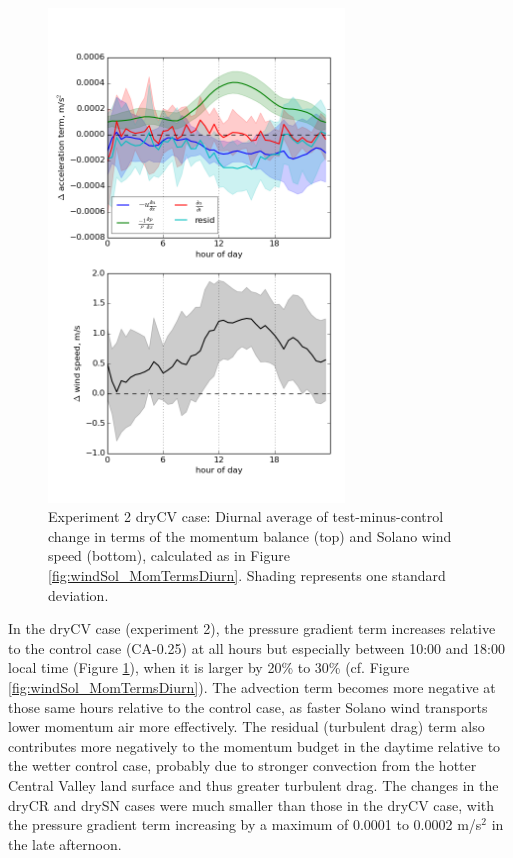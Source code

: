 \begin{figure}[here]
\includegraphics[width=0.7\textwidth]{ch3-wind/img/momentum_terms_diurnal_diff_dryCV.png}
\caption{Experiment 2 dryCV case: Diurnal average of test-minus-control change in terms of the momentum balance (top) and Solano wind speed (bottom), calculated as in Figure \ref{fig:windSol_MomTermsDiurn}.  Shading represents one standard deviation.}
\label{fig:windSol_MomTermsDiurnDiff}
\end{figure}

In the dryCV case (experiment 2), the pressure gradient term increases relative to the control case (CA-0.25) at all hours but especially between 10:00 and 18:00 local time (Figure \ref{fig:windSol_MomTermsDiurnDiff}), when it is larger by 20\% to 30\% (cf. Figure \ref{fig:windSol_MomTermsDiurn}).  The advection term becomes more negative at those same hours relative to the control case, as faster Solano wind transports lower momentum air more effectively.  The residual (turbulent drag) term also contributes more negatively to the momentum budget in the daytime relative to the wetter control case, probably due to stronger convection from the hotter Central Valley land surface and thus greater turbulent drag.  The changes in the dryCR and drySN cases were much smaller than those in the dryCV case, with the pressure gradient term increasing by a maximum of 0.0001 to 0.0002 m/s$^2$ in the late afternoon.

